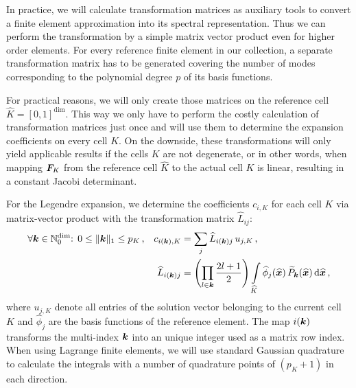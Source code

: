 In practice, we will calculate transformation matrices as auxiliary tools to convert a finite element approximation into its spectral representation. Thus we can perform the transformation by a simple matrix vector product even for higher order elements. For every reference finite element in our collection, a separate transformation matrix has to be generated covering the number of modes corresponding to the polynomial degree $p$ of its basis functions.

For practical reasons, we will only create those matrices on the reference cell $\widehat{K} = [0,1]^\text{dim}$. This way we only have to perform the costly calculation of transformation matrices just once and will use them to determine the expansion coefficients on every cell $K$. On the downside, these transformations will only yield applicable results if the cells $K$ are not degenerate, or in other words, when mapping $\mat{F}_K$ from the reference cell $\widehat{K}$ to the actual cell $K$ is linear, resulting in a constant Jacobi determinant.

For the Legendre expansion, we determine the coefficients $c_{i,K}$ for each cell $K$ via matrix-vector product with the transformation matrix $\widehat{L}_{ij}$:
\begin{align}
&\forall \tuple{k} \in \mathbb{N}_0^\text{dim} \text{: } 0 \leq \|\tuple{k}\|_1 \leq p_K \,\text{,} &
c_{i(\tuple{k}),K} &= \sum\limits_j \widehat{L}_{i(\tuple{k})j} \, u_{j,K} \,\text{,} \\
&& \widehat{L}_{i(\tuple{k})j} &= \left(\prod\limits_{l \in \tuple{k}} \frac{2l+1}{2}\right) \int\limits_{\widehat{K}} \widehat{\phi}_j(\vec{\widehat{x}}) \, \widetilde{P}_\tuple{k}(\vec{\widehat{x}}) \differential{\vec{\widehat{x}}} \,\text{,}
\end{align}
where $u_{j,K}$ denote all entries of the solution vector belonging to the current cell $K$ and $\widehat{\phi}_j$ are the basis functions of the reference element. The map $i(\tuple{k})$ transforms the multi-index $\tuple{k}$ into an unique integer used as a matrix row index. When using Lagrange finite elements, we will use standard Gaussian quadrature to calculate the integrals with a number of quadrature points of $(p_K + 1)$ in each direction.

